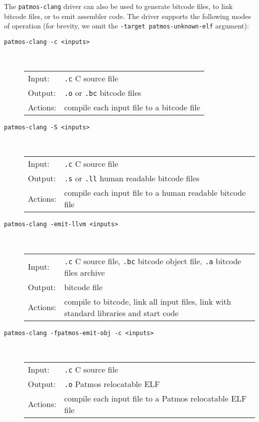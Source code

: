 The \texttt{patmos-clang} driver can also be used to generate bitcode files, to link bitcode files, or to 
emit assembler code. The driver supports the following modes of operation (for brevity, we omit the
\texttt{-target patmos-unknown-elf} argument):


\begin{description}
\item[\texttt{patmos-clang -c <inputs>}] \hfill\\
  \begin{tabular}{ll}
  Input:   & \texttt{.c} C source file \\
  Output:  & \texttt{.o} or \texttt{.bc} bitcode files \\
  Actions: & compile each input file to a bitcode file
  \end{tabular}

\item[\texttt{patmos-clang -S <inputs>}] \hfill\\
  \begin{tabular}{ll}
  Input:   & \texttt{.c} C source file \\
  Output:  & \texttt{.s} or \texttt{.ll} human readable bitcode files \\
  Actions: & compile each input file to a human readable bitcode file
  \end{tabular}

\item[\texttt{patmos-clang -emit-llvm <inputs>}] \hfill\\
  \begin{tabular}{ll}
  Input:   & \texttt{.c} C source file, \texttt{.bc} bitcode object file, \texttt{.a} bitcode files archive \\
  Output:  & bitcode file \\
  Actions: & compile to bitcode, link all input files, link with standard libraries and start code \\
\end{tabular}

\item[\texttt{patmos-clang -fpatmos-emit-obj -c <inputs>}] \hfill\\
  \begin{tabular}{ll}
  Input:   & \texttt{.c} C source file \\
  Output:  & \texttt{.o} Patmos relocatable ELF \\
  Actions: & compile each input file to a Patmos relocatable ELF file
  \end{tabular}


\end{description}
